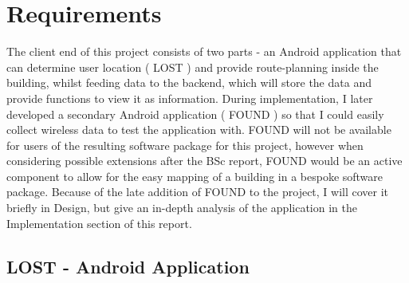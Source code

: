 \documentclass[11pt]{informatics-report}
\begin{document}
\chapter{Requirements}
The client end of this project consists of two parts - an Android application that can determine user location ( LOST ) and provide route-planning inside the building, whilst feeding data to the backend, which will store the data and provide functions to view it as information. During implementation, I later developed a secondary Android application ( FOUND ) so that I could easily collect wireless data to test the application with. FOUND will not be available for users of the resulting software package for this project, however when considering possible extensions after the BSc report, FOUND would be an active component to allow for the easy mapping of a building in a bespoke software package. Because of the late addition of FOUND to the project, I will cover it briefly in Design, but give an in-depth analysis of the application in the Implementation section of this report.

\section{LOST - Android Application}
\end{document}
